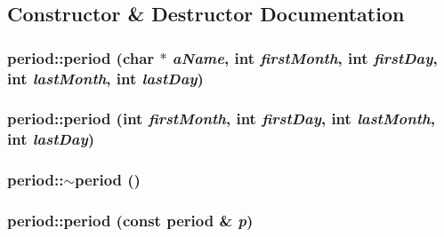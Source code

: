 \subsection{Constructor \& Destructor Documentation}
\hypertarget{classperiod_a8dba558cbe5839a6cafaa56190a181b2}{
\subsubsection[{period}]{\setlength{\rightskip}{0pt plus 5cm}period::period (char $\ast$ {\em aName}, \/  int {\em firstMonth}, \/  int {\em firstDay}, \/  int {\em lastMonth}, \/  int {\em lastDay})}}
\label{classperiod_a8dba558cbe5839a6cafaa56190a181b2}
\hypertarget{classperiod_ae724d1884ef14f0c62c3ca070216dcf8}{
\subsubsection[{period}]{\setlength{\rightskip}{0pt plus 5cm}period::period (int {\em firstMonth}, \/  int {\em firstDay}, \/  int {\em lastMonth}, \/  int {\em lastDay})}}
\label{classperiod_ae724d1884ef14f0c62c3ca070216dcf8}
\hypertarget{classperiod_ad8c2607a3f178c1fbe14c85a77adf936}{
\subsubsection[{$\sim$period}]{\setlength{\rightskip}{0pt plus 5cm}period::$\sim$period ()}}
\label{classperiod_ad8c2607a3f178c1fbe14c85a77adf936}
\hypertarget{classperiod_a83a82ed64e5c82168451e978fc253556}{
\subsubsection[{period}]{\setlength{\rightskip}{0pt plus 5cm}period::period (const {\bf period} \& {\em p})}}
\label{classperiod_a83a82ed64e5c82168451e978fc253556}


